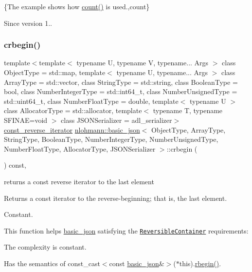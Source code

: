 \{The example shows how {\ttfamily \mbox{\hyperlink{classnlohmann_1_1basic__json_a5261eba9637f59d17d6cab5f14ce5747}{count()}}} is used.,count\}

\begin{DoxySince}{Since}
version 1.. 
\end{DoxySince}
\mbox{\label{classnlohmann_1_1basic__json_a1e0769d22d54573f294da0e5c6abc9de}} 
\subsubsection{\texorpdfstring{crbegin()}{crbegin()}}
{\footnotesize\ttfamily template$<$template$<$ typename U, typename V, typename... Args $>$ class Object\+Type = std\+::map, template$<$ typename U, typename... Args $>$ class Array\+Type = std\+::vector, class String\+Type  = std\+::string, class Boolean\+Type  = bool, class Number\+Integer\+Type  = std\+::int64\+\_\+t, class Number\+Unsigned\+Type  = std\+::uint64\+\_\+t, class Number\+Float\+Type  = double, template$<$ typename U $>$ class Allocator\+Type = std\+::allocator, template$<$ typename T, typename S\+F\+I\+N\+A\+E=void $>$ class J\+S\+O\+N\+Serializer = adl\+\_\+serializer$>$ \\
\mbox{\hyperlink{classnlohmann_1_1basic__json_a72be3c24bfa24f0993d6c11af03e7404}{const\+\_\+reverse\+\_\+iterator}} \mbox{\hyperlink{classnlohmann_1_1basic__json}{nlohmann\+::basic\+\_\+json}}$<$ Object\+Type, Array\+Type, String\+Type, Boolean\+Type, Number\+Integer\+Type, Number\+Unsigned\+Type, Number\+Float\+Type, Allocator\+Type, J\+S\+O\+N\+Serializer $>$\+::crbegin (\begin{DoxyParamCaption}{ }\end{DoxyParamCaption}) const\hspace{0.3cm}{\ttfamily [inline]}, {\ttfamily [noexcept]}}



returns a const reverse iterator to the last element 

Returns a const iterator to the reverse-\/beginning; that is, the last element.

  Constant.

This function helps {\ttfamily \mbox{\hyperlink{classnlohmann_1_1basic__json}{basic\+\_\+json}}} satisfying the \href{http://en.cppreference.com/w/cpp/concept/ReversibleContainer}{\tt Reversible\+Container} requirements\+:
\begin{DoxyItemize}
\item The complexity is constant.
\item Has the semantics of {\ttfamily const\+\_\+cast$<$const \mbox{\hyperlink{classnlohmann_1_1basic__json}{basic\+\_\+json}}\&$>$($\ast$this).\mbox{\hyperlink{classnlohmann_1_1basic__json_a1ef93e2006dbe52667294f5ef38b0b10}{rbegin()}}}.
\end{DoxyItemize}

